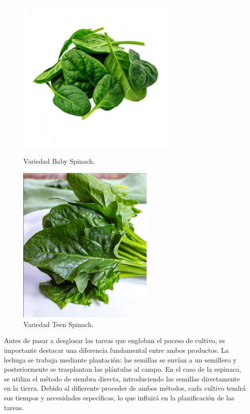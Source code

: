 \begin{figure}[ht!]
    \centering

    \begin{minipage}[b]{0.45\textwidth}
        \centering
        \includegraphics[width=0.7\textwidth]{img/baby_spinach.png}
        \caption{Variedad Baby Spinach.}
        \label{fig:baby}
    \end{minipage}
    \hfill
    \begin{minipage}[b]{0.45\textwidth}
        \centering
        \includegraphics[width=0.6\textwidth]{img/teen_spinach.png}
        \caption{Variedad Teen Spinach.}
        \label{fig:teen}
    \end{minipage}

\end{figure}


Antes de pasar a desglosar las tareas que engloban el poceso de cultivo, es importante destacar una diferencia fundamental entre ambos productos.
La lechuga se trabaja mediante plantación: las semillas se envían a un semillero y posteriormente se trasplantan las plántulas al campo. 
En el caso de la espinaca, se utiliza el método de siembra directa, introduciendo las semillas directamente en la tierra.
Debido al difierente proceder de ambos métodos, cada cultivo tendrá sus tiempos y necesidades específicas, lo que influirá en la planificación de las tareas.




